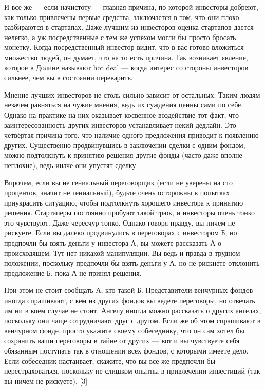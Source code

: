 \documentclass[ebook,12pt,oneside,openany]{memoir}
\begin{document}
И все же — если начистоту — главная причина, по которой инвесторы
добреют, как только привлечены первые средства, заключается в том, что
они плохо разбираются в стартапах. Даже лучшим из инвесторов оценка
стартапов дается нелегко, а уж посредственные с тем же успехом могли
бы просто бросать монетку. Когда посредственный инвестор видит, что в
вас готово вложиться множество людей, он думает, что на то есть
причина. Так возникает явление, которое в Долине называют hot deal —
когда интерес со стороны инвесторов сильнее, чем вы в состоянии
переварить.

Мнение лучших инвесторов не столь сильно зависит от остальных. Таким
людям незачем равняться на чужие мнения, ведь их суждения ценны сами
по себе. Однако на практике на них оказывает косвенное воздействие тот
факт, что заинтересованность других инвесторов устанавливает некий
дедлайн. Это — четвёртая причина того, что наличие одного предложения
приводит к появлению других. Существенно продвинувшись в заключении
сделки с одним фондом, можно подтолкнуть к принятию решения другие
фонды (часто даже вполне неплохие), ведь иначе они упустят сделку.

Впрочем, если вы не гениальный переговорщик (если не уверены на сто
процентов, значит не гениальный), будьте очень осторожны в попытках
приукрасить ситуацию, чтобы подтолкнуть хорошего инвестора к принятию
решения. Стартаперы постоянно пробуют такой трюк, и инвесторы очень
тонко это чувствуют. Даже чересчур тонко. Однако говоря правду, вы
ничем не рискуете. Если вы далеко продвинулись в переговорах с
инвестором Б, но предпочли бы взять деньги у инвестора А, вы можете
рассказать А о происходящем. Тут нет никакой манипуляции. Вы ведь и
правда в трудном положении, поскольку предпочли бы взять деньги у А,
но не рискнете отклонить предложение Б, пока А не принял решения.

При этом не стоит сообщать А, кто такой Б. Представители венчурных
фондов иногда спрашивают, с кем из других фондов вы ведете переговоры,
но отвечать им ни в коем случае не стоит. Ангелу иногда можно
рассказать о других ангелах, поскольку они чаще сотрудничают друг с
другом. Если же об этом спрашивают в венчурном фонде, просто укажите
своему собеседнику, что он сам хотел бы сохранить ваши переговоры в
тайне от других — вот и вы чувствуете себя обязанным поступать так в
отношении всех фондов, с которыми имеете дело. Если собеседник
настаивает, скажите, что вы все же предпочли бы перестраховаться,
поскольку не слишком опытны в привлечении инвестиций (так вы ничем не
рискуете). [3]
\end{document}
